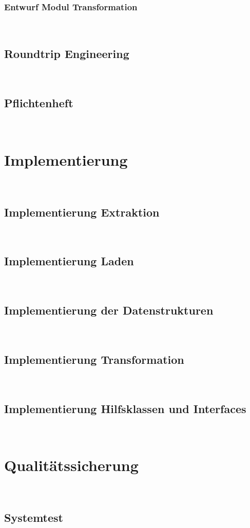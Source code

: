 \documentclass[11pt,toc=sectionentrywithoutdots, headheight=44pt, headings=optiontoheadandtoc, hyperfootnotes=false]{scrartcl}
\begin{document}
\subsubsection{Entwurf Modul Transformation}
\blindtext\

\subsection{Roundtrip Engineering}
\blindtext\

\subsection{Pflichtenheft}
\blindtext\

\section{Implementierung}
\blindtext\

\subsection{Implementierung Extraktion}
\blindtext\

\subsection{Implementierung Laden}
\blindtext\

\subsection{Implementierung der Datenstrukturen}
\blindtext\

\subsection{Implementierung Transformation}
\blindtext\

\subsection{Implementierung Hilfsklassen und Interfaces}
\blindtext\

\section{Qualitätssicherung}
\blindtext\

\subsection{Systemtest}
\blindtext\
\end{document}
